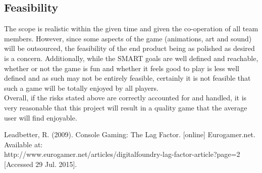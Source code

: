 \documentclass[a4paper,10pt]{article}
\begin{document}
\subsection{Feasibility}
The scope is realistic within the given time and given the co-operation of all team members. However, since some aspects of the game (animations, art and sound) will be outsourced, the feasibility of the end product being as polished as desired is a concern. Additionally, while the SMART goals are well defined and reachable, whether or not the game is fun and whether it feels good to play is less well defined and as such may not be entirely feasible, certainly it is not feasible that such a game will be totally enjoyed by all players.
\smallskip\\
 Overall, if the risks stated above are correctly accounted for and handled, it is very reasonable that this project will result in a quality game that the average user will find enjoyable.
\newpage

\begin{thebibliography}{9} 
	 Leadbetter, R. (2009). Console Gaming: The Lag Factor. [online] Eurogamer.net. Available at: \\http://www.eurogamer.net/articles/digitalfoundry-lag-factor-article?page=2 [Accessed 29 Jul. 2015]. 
\end{thebibliography}
\end{document}

